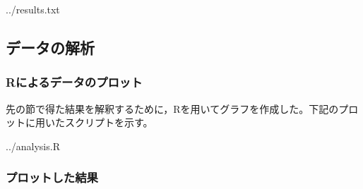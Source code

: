 \documentclass[10pt,a4,uplatex]{jsarticle}
\begin{document}

{../results.txt}

\subsection{データの解析}
\subsubsection{Rによるデータのプロット}
先の節で得た結果を解釈するために，Rを用いてグラフを作成した。下記のプロットに用いたスクリプトを示す。

{../analysis.R}

\subsubsection{プロットした結果}
\end{document}
